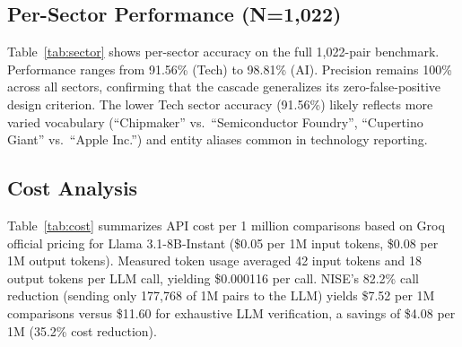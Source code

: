 \documentclass[conference]{IEEEtran}
\begin{document}
\subsection{Per-Sector Performance (N=1,022)}
Table~\ref{tab:sector} shows per-sector accuracy on the full 1,022-pair benchmark.
Performance ranges from 91.56\% (Tech) to 98.81\% (AI).
Precision remains 100\% across all sectors, confirming that the cascade generalizes its zero-false-positive design criterion.
The lower Tech sector accuracy (91.56\%) likely reflects more varied vocabulary (``Chipmaker'' vs.\ ``Semiconductor Foundry'', ``Cupertino Giant'' vs.\ ``Apple Inc.'') and entity aliases common in technology reporting.

\begin{table}[!t]
\centering
\caption{Per-Sector NISE Cascade Performance (N=1,022)}
\label{tab:sector}
\end{table}

\subsection{Cost Analysis}
Table~\ref{tab:cost} summarizes API cost per 1 million comparisons based on Groq official pricing for Llama 3.1-8B-Instant (\$0.05 per 1M input tokens, \$0.08 per 1M output tokens).
Measured token usage averaged 42 input tokens and 18 output tokens per LLM call, yielding \$0.000116 per call.
NISE's 82.2\% call reduction (sending only 177,768 of 1M pairs to the LLM) yields \$7.52 per 1M comparisons versus \$11.60 for exhaustive LLM verification, a savings of \$4.08 per 1M (35.2\% cost reduction).
\end{document}
